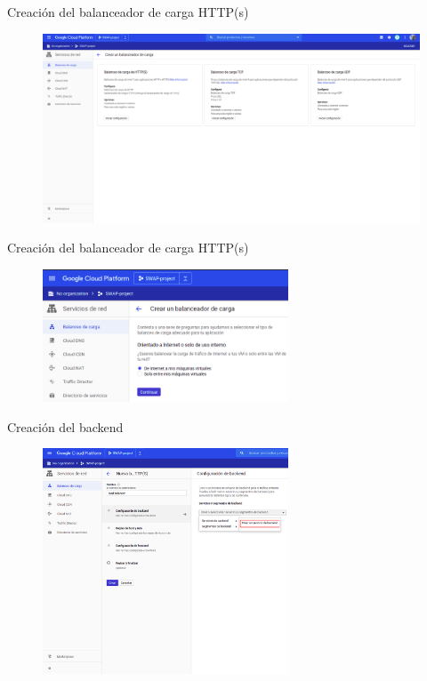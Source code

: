\documentclass{beamer}
\begin{document}
\begin{frame}[fragile]{Creación del balanceador de carga HTTP(s)}
  \begin{figure}[H]
		\centering
		\includegraphics[width=\textwidth]{project/loadbalancerhttps.png}
	\end{figure}
\end{frame}

\begin{frame}[fragile]{Creación del balanceador de carga HTTP(s)}
  \begin{figure}[H]
		\centering
		\includegraphics[width=0.65\textwidth]{project/frominternet.png}
	\end{figure}
\end{frame}

\begin{frame}[fragile]{Creación del backend}
  \begin{figure}[H]
		\centering
		\includegraphics[width=0.65\textwidth]{project/backend.png}
	\end{figure}
\end{frame}
\end{document}
